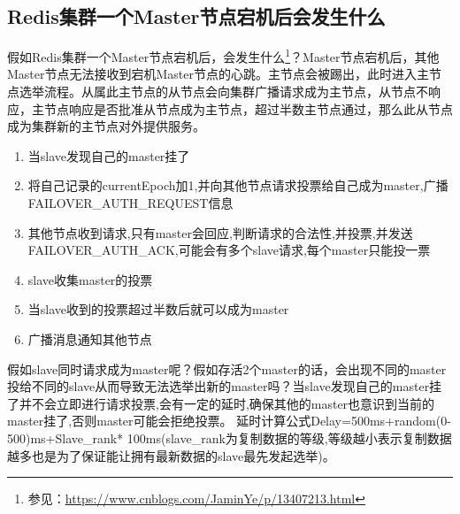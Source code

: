\documentclass[../../../interview-questions.tex]{subfiles}
\begin{document}
\subsection{Redis集群一个Master节点宕机后会发生什么}

假如Redis集群一个Master节点宕机后，会发生什么\footnote{参见：\url{https://www.cnblogs.com/JaminYe/p/13407213.html}}？Master节点宕机后，其他Master节点无法接收到宕机Master节点的心跳。主节点会被踢出，此时进入主节点选举流程。从属此主节点的从节点会向集群广播请求成为主节点，从节点不响应，主节点响应是否批准从节点成为主节点，超过半数主节点通过，那么此从节点成为集群新的主节点对外提供服务。

\begin{enumerate}
    \item {当slave发现自己的master挂了}
    \item {将自己记录的currentEpoch加1,并向其他节点请求投票给自己成为master,广播FAILOVER\_AUTH\_REQUEST信息}
    \item {其他节点收到请求,只有master会回应,判断请求的合法性,并投票,并发送FAILOVER\_AUTH\_ACK,可能会有多个slave请求,每个master只能投一票}
    \item {slave收集master的投票}
    \item {当slave收到的投票超过半数后就可以成为master}
    \item {广播消息通知其他节点}
\end{enumerate}

假如slave同时请求成为master呢？假如存活2个master的话，会出现不同的master投给不同的slave从而导致无法选举出新的master吗？当slave发现自己的master挂了并不会立即进行请求投票,会有一定的延时,确保其他的master也意识到当前的master挂了,否则master可能会拒绝投票。
延时计算公式Delay=500ms+random(0-500)ms+Slave\_rank* 100ms(slave\_rank为复制数据的等级,等级越小表示复制数据越多也是为了保证能让拥有最新数据的slave最先发起选举)。
\end{document}
